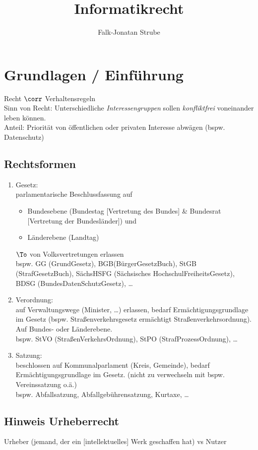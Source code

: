 \documentclass{scrreprt}
\title{Informatikrecht}
\author{Falk-Jonatan Strube}
\begin{document}
\maketitle
\tableofcontents

\setcounter{chapter}{-1}
\chapter{Grundlagen / Einführung}
Recht $\corr$ Verhaltensregeln\\
Sinn von Recht: Unterschiedliche \emph{Interessengruppen} sollen \emph{konfliktfrei} voneinander leben können.\\
Anteil: Priorität von öffentlichen oder privaten Interesse abwägen (bspw. Datenschutz)

\section{Rechtsformen}
\begin{enumerate}
\item Gesetz:\\
parlamentarische Beschlussfassung auf
\begin{itemize}
\item Bundesebene (Bundestag [Vertretung des Bundes] \& Bundesrat [Vertretung der Bundesländer]) und 
\item Länderebene (Landtag) 
\end{itemize}
$\To$ von Volksvertretungen erlassen\\
bspw. GG (GrundGesetz), BGB(BürgerGesetzBuch), StGB (StrafGesetzBuch), SächsHSFG (Sächsisches HochschulFreiheitsGesetz), BDSG (BundesDatenSchutzGesetz), …
\item Verordnung:\\
auf Verwaltungswege (Minister, …) erlassen, bedarf Ermächtigungsgrundlage im Gesetz (bspw. Straßenverkehrsgesetz ermächtigt Straßenverkehrsordnung). Auf Bundes- oder Länderebene.\\
bspw. StVO (StraßenVerkehrsOrdnung), StPO (StrafProzessOrdnung), …
\item Satzung:\\
beschlossen auf Kommunalparlament (Kreis, Gemeinde), bedarf Ermächtigungsgrundlage im Gesetz. (nicht zu verwechseln mit bspw. Vereinssatzung o.ä.)\\
bspw. Abfallsatzung, Abfallgebührensatzung, Kurtaxe, …
\end{enumerate}

\section{Hinweis Urheberrecht}
Urheber (jemand, der ein [intellektuelles] Werk geschaffen hat) vs Nutzer
\end{document}

